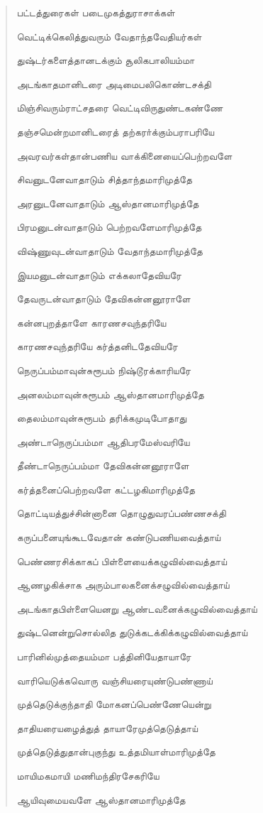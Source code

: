 \documentclass{article}
\begin{document}
\begin{quotation}
{பட்டத்துரைகள் படைமுகத்துராசாக்கள்

வெட்டிக்கெலித்துவரும் வேதாந்தவேதியர்கள்

துஷ்டர்களைத்தானடக்கும் சூலிகபாலியம்மா

அடங்காதமானிடரை அடிமைபலிகொண்டசக்தி

மிஞ்சிவரும்ராட்சதரை வெட்டிவிருதுண்டகண்ணே

தஞ்சமென்றமானிடரைத் தற்கரா்க்கும்பராபரியே

அவரவர்கள்தான்பணிய வாக்கினையைப்பெற்றவளே

சிவனுடனேவாதாடும் சித்தாந்தமாரிமுத்தே

அரனுடனேவாதாடும் ஆஸ்தானமாரிமுத்தே

பிரமனுடன்வாதாடும் பெற்றவளேமாரிமுத்தே

விஷ்ணுவுடன்வாதாடும் வேதாந்தமாரிமுத்தே

இயமனுடன்வாதாடும் எக்கலாதேவியரே

தேவருடன்வாதாடும் தேவிகன்னனூராளே

கன்னபுறத்தாளே காரணசவுந்தரியே

காரணசவுந்தரியே கர்த்தனிடதேவியரே

நெருப்பம்மாவுன்சுரூபம் நிஷ்டூரக்காரியரே

அனலம்மாவுன்சுரூபம் ஆஸ்தானமாரிமுத்தே

தைலம்மாவுன்சுரூபம் தரிக்கமுடிபோதாது

அண்டாநெருப்பம்மா ஆதிபரமேஸ்வரியே

தீண்டாநெருப்பம்மா தேவிகன்னனூராளே

கர்த்தனைப்பெற்றவளே கட்டழகிமாரிமுத்தே

தொட்டியத்துச்சின்னானை தொழுதுவரப்பண்ணசக்தி

கருப்பனையுங்கூடவேதான் கண்டுபணியவைத்தாய்

பெண்ணரசிக்காகப் பிள்ளையைக்கழுவில்வைத்தாய்

ஆணழகிக்சாக அரும்பாலகனைக்சழுவில்வைத்தாய்

அடங்காதபிள்ளையெனறு ஆண்டவனைக்கழுவில்வைத்தாய்

துஷ்டனென்றுசொல்லித துடுக்கடக்கிக்கழுவில்வைத்தாய்

பாரினில்முத்தையம்மா பத்தினியேதாயாரே

வாரியெடுக்கவொரு வஞ்சியரையுண்டுபண்ணாய்

முத்தெடுக்குந்தாதி மோகனப்பெண்ணேயென்று

தாதியரையழைத்துத் தாயாரேமுத்தெடுத்தாய்

முத்தெடுத்துதான்புகுந்து உத்தமியாள்மாரிமுத்தே

மாயிமகமாயி மணிமந்திரசேகரியே

ஆயிவுமையவளே ஆஸ்தானமாரிமுத்தே

}
\end{quotation}
\end{document}
